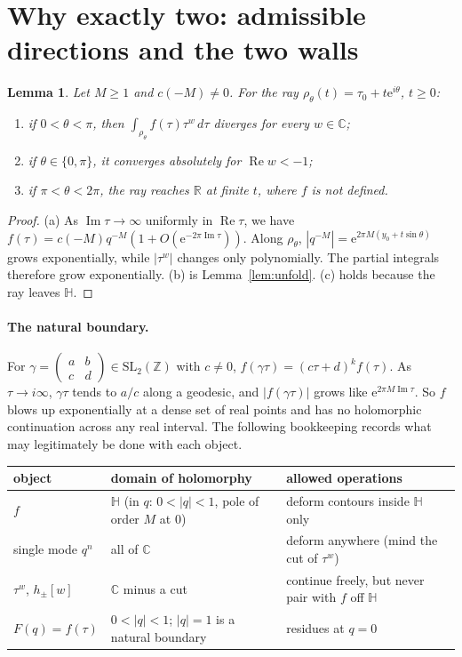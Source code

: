 \documentclass[11pt]{article}
\newtheorem{lemma}[theorem]{Lemma}
\theoremstyle{definition}
\theoremstyle{remark}
\newcommand{\HH}{\mathbb{H}}
\newcommand{\CC}{\mathbb{C}}
\newcommand{\RR}{\mathbb{R}}
\newcommand{\ZZ}{\mathbb{Z}}
\newcommand{\SLZ}{\mathrm{SL}_2(\ZZ)}
\newcommand{\e}{\mathrm{e}}
\begin{document}
\section{Why exactly two: admissible directions and the two walls}

\begin{lemma}\label{lem:directions}
Let $M\ge1$ and $c(-M)\ne0$. For the ray $\rho_\theta(t)=\tau_0+t\e^{i\theta}$, $t\ge0$:
\begin{enumerate}
\item[(a)] if $0<\theta<\pi$, then $\int_{\rho_\theta}f(\tau)\tau^w\,d\tau$ diverges for every $w\in\CC$;
\item[(b)] if $\theta\in\{0,\pi\}$, it converges absolutely for $\operatorname{Re}w<-1$;
\item[(c)] if $\pi<\theta<2\pi$, the ray reaches $\RR$ at finite $t$, where $f$ is not defined.
\end{enumerate}
\end{lemma}
\begin{proof}
(a) As $\operatorname{Im}\tau\to\infty$ uniformly in $\operatorname{Re}\tau$, we have $f(\tau)=c(-M)q^{-M}(1+O(\e^{-2\pi\operatorname{Im}\tau}))$.
Along $\rho_\theta$, $|q^{-M}|=\e^{2\pi M(y_0+t\sin\theta)}$ grows exponentially, while $|\tau^w|$ changes only
polynomially. The partial integrals therefore grow exponentially. (b) is Lemma~\ref{lem:unfold}.
(c) holds because the ray leaves $\HH$.
\end{proof}

\paragraph{The natural boundary.}
For $\gamma=\left(\begin{smallmatrix}a&b\\c&d\end{smallmatrix}\right)\in\SLZ$ with $c\neq 0$,
$f(\gamma\tau)=(c\tau+d)^kf(\tau)$. As $\tau\to i\infty$, $\gamma\tau$ tends to $a/c$ along a
geodesic, and $|f(\gamma\tau)|$ grows like $\e^{2\pi M\operatorname{Im}\tau}$. So $f$ blows up
exponentially at a dense set of real points and has no holomorphic continuation across
any real interval. The following bookkeeping records what may legitimately be done with
each object.

\begin{center}\small
\begin{tabular}{@{}p{}p{}p{}@{}}
\toprule
object & domain of holomorphy & allowed operations\\\midrule
$f$ & $\HH$ (in $q$: $0<|q|<1$, pole of order $M$ at $0$) & deform contours inside $\HH$ only\\
single mode $q^n$ & all of $\CC$ & deform anywhere (mind the cut of $\tau^w$)\\
$\tau^w$, $h_\pm[w]$ & $\CC$ minus a cut & continue freely, but never pair with $f$ off $\HH$\\
$F(q)=f(\tau)$ & $0<|q|<1$; $|q|=1$ is a natural boundary & residues at $q=0$\\
\bottomrule
\end{tabular}
\end{center}
\end{document}
